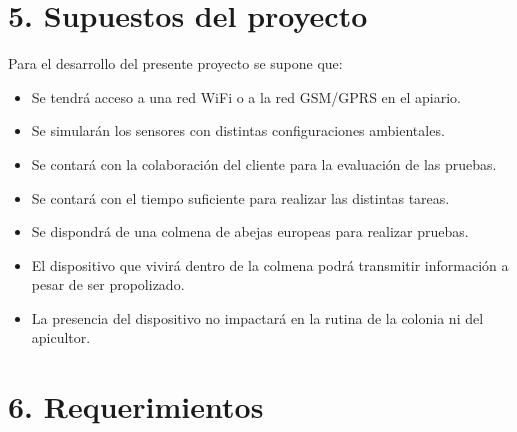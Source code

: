 \documentclass[
11pt, %
codirector, %
]{charter}
\begin{document}
\section{5. Supuestos del proyecto}
\label{sec:supuestos}

Para el desarrollo del presente proyecto se supone que:

\begin{itemize}
\item Se tendrá acceso a una red WiFi o a la red GSM/GPRS en el apiario.
\item Se simularán los sensores con distintas configuraciones ambientales.
\item Se contará con la colaboración del cliente para la evaluación de las pruebas.
\item Se contará con el tiempo suficiente para realizar las distintas tareas.
\item Se dispondrá de una colmena de abejas europeas para realizar pruebas.
\item El dispositivo que vivirá dentro de la colmena podrá transmitir información a pesar de ser propolizado.
\item La presencia del dispositivo no impactará en la rutina de la colonia ni del apicultor.
\end{itemize}

\section{6. Requerimientos}
\label{sec:requerimientos}

\end{document}
